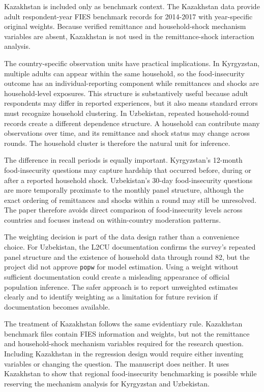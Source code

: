 \documentclass[11pt]{article}
\begin{document}
Kazakhstan is included only as benchmark context. The Kazakhstan data provide adult respondent-year FIES benchmark records for 2014-2017 with year-specific original weights. Because verified remittance and household-shock mechanism variables are absent, Kazakhstan is not used in the remittance-shock interaction analysis.

The country-specific observation units have practical implications. In Kyrgyzstan, multiple adults can appear within the same household, so the food-insecurity outcome has an individual-reporting component while remittances and shocks are household-level exposures. This structure is substantively useful because adult respondents may differ in reported experiences, but it also means standard errors must recognize household clustering. In Uzbekistan, repeated household-round records create a different dependence structure. A household can contribute many observations over time, and its remittance and shock status may change across rounds. The household cluster is therefore the natural unit for inference.

The difference in recall periods is equally important. Kyrgyzstan's 12-month food-insecurity questions may capture hardship that occurred before, during or after a reported household shock. Uzbekistan's 30-day food-insecurity questions are more temporally proximate to the monthly panel structure, although the exact ordering of remittances and shocks within a round may still be unresolved. The paper therefore avoids direct comparison of food-insecurity levels across countries and focuses instead on within-country moderation patterns.

The weighting decision is part of the data design rather than a convenience choice. For Uzbekistan, the L2CU documentation confirms the survey's repeated panel structure and the existence of household data through round 82, but the project did not approve \texttt{popw} for model estimation. Using a weight without sufficient documentation could create a misleading appearance of official population inference. The safer approach is to report unweighted estimates clearly and to identify weighting as a limitation for future revision if documentation becomes available.

The treatment of Kazakhstan follows the same evidentiary rule. Kazakhstan benchmark files contain FIES information and weights, but not the remittance and household-shock mechanism variables required for the research question. Including Kazakhstan in the regression design would require either inventing variables or changing the question. The manuscript does neither. It uses Kazakhstan to show that regional food-insecurity benchmarking is possible while reserving the mechanism analysis for Kyrgyzstan and Uzbekistan.
\end{document}
